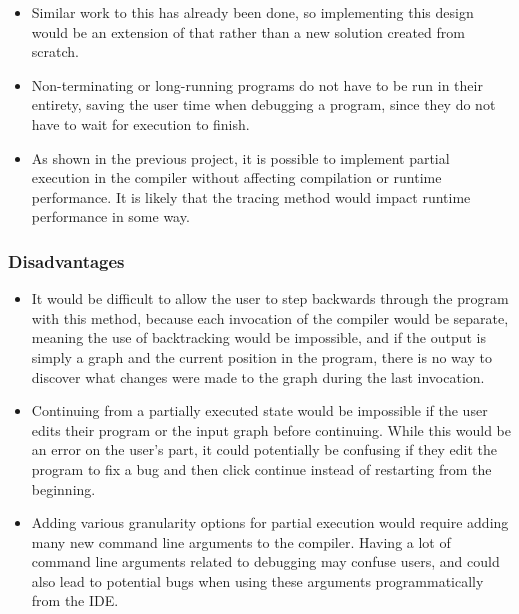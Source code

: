 \documentclass[authoryearcitations]{UoYCSproject}
\begin{document}
\begin{itemize}
    \item Similar work to this has already been done, so implementing this
          design would be an extension of that rather than a new solution
          created from scratch.

    \item Non-terminating or long-running programs do not have to be run in their
          entirety, saving the user time when debugging a program, since they do
          not have to wait for execution to finish.

    \item As shown in the previous project, it is possible to implement partial
          execution in the compiler without affecting compilation or runtime
          performance. It is likely that the tracing method would impact runtime
          performance in some way.
\end{itemize}


\subsubsection{Disadvantages}
\label{sec:ProposedDesign1Disadvantages}

\begin{itemize}
    \item It would be difficult to allow the user to step backwards through the
          program with this method, because each invocation of the compiler
          would be separate, meaning the use of backtracking would be impossible,
          and if the output is simply a graph and the current position in the
          program, there is no way to discover what changes were made to the graph
          during the last invocation.

    \item Continuing from a partially executed state would be impossible if the
          user edits their program or the input graph before continuing. While
          this would be an error on the user's part, it could potentially be
          confusing if they edit the program to fix a bug and then click continue
          instead of restarting from the beginning.

    \item Adding various granularity options for partial execution would require
          adding many new command line arguments to the compiler. Having a lot
          of command line arguments related to debugging may confuse users, and
          could also lead to potential bugs when using these arguments
          programmatically from the IDE.
\end{itemize}
\end{document}
